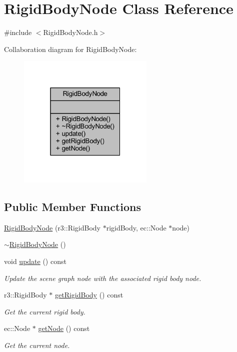 \hypertarget{class_rigid_body_node}{}\section{Rigid\+Body\+Node Class Reference}
\label{class_rigid_body_node}


{\ttfamily \#include $<$Rigid\+Body\+Node.\+h$>$}



Collaboration diagram for Rigid\+Body\+Node\+:\nopagebreak
\begin{figure}[H]
\begin{center}
\leavevmode
\includegraphics[width=184pt]{class_rigid_body_node__coll__graph}
\end{center}
\end{figure}
\subsection*{Public Member Functions}
\begin{DoxyCompactItemize}
\item 
\mbox{\hyperlink{class_rigid_body_node_a8ce6244b5ddff6ffcae6273e2613ec7c}{Rigid\+Body\+Node}} (r3\+::\+Rigid\+Body $\ast$rigid\+Body, ec\+::\+Node $\ast$node)
\item 
\mbox{\hyperlink{class_rigid_body_node_a9fab17e299f7e471c726d644cb65aedf}{$\sim$\+Rigid\+Body\+Node}} ()
\item 
void \mbox{\hyperlink{class_rigid_body_node_aa40aff305449fa4b1d8b1c665548f862}{update}} () const
\begin{DoxyCompactList}\small\item\em Update the scene graph node with the associated rigid body node. \end{DoxyCompactList}\item 
r3\+::\+Rigid\+Body $\ast$ \mbox{\hyperlink{class_rigid_body_node_ab1a0b587bed1ff3298da3b382ada784f}{get\+Rigid\+Body}} () const
\begin{DoxyCompactList}\small\item\em Get the current rigid body. \end{DoxyCompactList}\item 
ec\+::\+Node $\ast$ \mbox{\hyperlink{class_rigid_body_node_a1004482a1aa31b8bd7df515815b0fc59}{get\+Node}} () const
\begin{DoxyCompactList}\small\item\em Get the current node. \end{DoxyCompactList}\end{DoxyCompactItemize}


